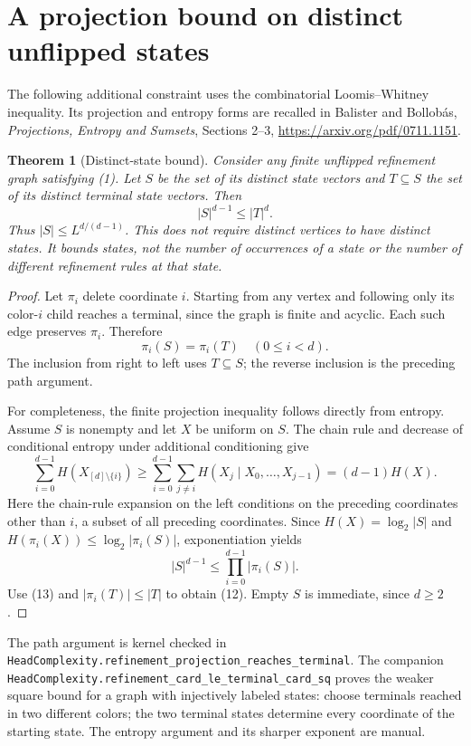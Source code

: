\documentclass[11pt]{article}
\newtheorem{theorem}{Theorem}
\begin{document}
\section{A projection bound on distinct unflipped states}

The following additional constraint uses the combinatorial
Loomis--Whitney inequality. Its projection and entropy forms are recalled
in Balister and Bollob\'as, \emph{Projections, Entropy and Sumsets},
Sections 2--3, \url{https://arxiv.org/pdf/0711.1151}.

\begin{theorem}[Distinct-state bound]
Consider any finite unflipped refinement graph satisfying (1).
Let $S$ be the set of its distinct state vectors and $T\subseteq S$
the set of its distinct terminal state vectors. Then
\[
              |S|^{d-1}\le |T|^d. \tag{12}
\]
Thus $|S|\le L^{d/(d-1)}$. This does not require distinct vertices to
have distinct states. It bounds states, not the number of occurrences
of a state or the number of different refinement rules at that state.
\end{theorem}
\begin{proof}
Let $\pi_i$ delete coordinate $i$. Starting from any vertex and
following only its color-$i$ child reaches a terminal, since the graph
is finite and acyclic. Each such edge preserves $\pi_i$. Therefore
\[
                         \pi_i(S)=\pi_i(T)
                         \quad(0\le i<d). \tag{13}
\]
The inclusion from right to left uses $T\subseteq S$; the reverse
inclusion is the preceding path argument.

For completeness, the finite projection inequality follows directly
from entropy. Assume $S$ is nonempty and let $X$ be uniform on $S$.
The chain rule and decrease of conditional entropy under additional
conditioning give
\[
 \sum_{i=0}^{d-1}H(X_{[d]\setminus\{i\}})
 \ge \sum_{i=0}^{d-1}\sum_{j\ne i}
             H(X_j\mid X_0,\ldots,X_{j-1})
 =(d-1)H(X).
\]
Here the chain-rule expansion on the left conditions on the preceding
coordinates other than $i$, a subset of all preceding coordinates.
Since $H(X)=\log_2|S|$ and
$H(\pi_i(X))\le\log_2|\pi_i(S)|$, exponentiation yields
\[
              |S|^{d-1}\le\prod_{i=0}^{d-1}|\pi_i(S)|.
\]
Use (13) and $|\pi_i(T)|\le |T|$ to obtain (12). Empty $S$ is
immediate, since $d\ge2$.
\end{proof}

The path argument is kernel checked in
\texttt{HeadComplexity.refinement\_projection\_reaches\_terminal}.
The companion
\texttt{HeadComplexity.refinement\_card\_le\_terminal\_card\_sq}
proves the weaker square bound for a graph with injectively labeled
states: choose terminals reached in two different colors; the two
terminal states determine every coordinate of the starting state.
The entropy argument and its sharper exponent are manual.
\end{document}
